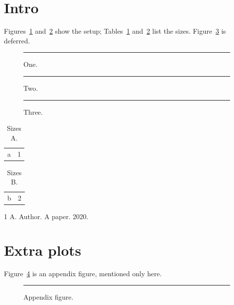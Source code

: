\documentclass{article}
\begin{document}
\section{Intro}
Figures~\ref{f1} and~\ref{f2} show the setup; Tables~\ref{t1} and~\ref{t2} list the sizes. Figure~\ref{f3} is deferred.
\begin{figure}[t]\centering\rule{\textwidth}{0.8\textheight}\caption{One.}\label{f1}\end{figure}
\begin{figure}[t]\centering\rule{\textwidth}{0.8\textheight}\caption{Two.}\label{f2}\end{figure}
\begin{figure}[t]\centering\rule{\textwidth}{0.8\textheight}\caption{Three.}\label{f3}\end{figure}
\begin{table}[h]\centering\begin{tabular}{lr}a&1\\\end{tabular}\caption{Sizes A.}\label{t1}\end{table}
\begin{table}[h]\centering\begin{tabular}{lr}b&2\\\end{tabular}\caption{Sizes B.}\label{t2}\end{table}
\lipsum[1-4]
\begin{thebibliography}{1}
 A. Author. A paper. 2020.
\end{thebibliography}
\appendix
\renewcommand{\thefigure}{A.\arabic{figure}}
\setcounter{figure}{0}
\section{Extra plots}
Figure~\ref{fa} is an appendix figure, mentioned only here.
\begin{figure}[h]\centering\rule{3cm}{1cm}\caption{Appendix figure.}\label{fa}\end{figure}
\end{document}

